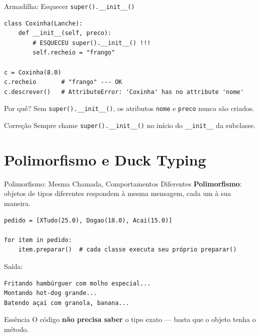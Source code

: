 \documentclass[aspectratio=169]{beamer}
\begin{document}
\begin{frame}[fragile]{Armadilha: Esquecer \texttt{super().\_\_init\_\_()}}
  \begin{lstlisting}
class Coxinha(Lanche):
    def __init__(self, preco):
        # ESQUECEU super().__init__() !!!
        self.recheio = "frango"

c = Coxinha(8.0)
c.recheio       # "frango" --- OK
c.descrever()   # AttributeError: 'Coxinha' has no attribute 'nome'
  \end{lstlisting}

  \begin{alertblock}{Por quê?}
    Sem \texttt{super().\_\_init\_\_()}, os atributos \texttt{nome} e \texttt{preco} nunca são criados.
  \end{alertblock}

  \begin{exampleblock}{Correção}
    Sempre chame \texttt{super().\_\_init\_\_()} no início do \texttt{\_\_init\_\_} da subclasse.
  \end{exampleblock}
\end{frame}

\section{Polimorfismo e Duck Typing}

\begin{frame}[fragile]{Polimorfismo: Mesma Chamada, Comportamentos Diferentes}
  \textbf{Polimorfismo}: objetos de tipos diferentes respondem à mesma mensagem, cada um à sua maneira.

  \begin{lstlisting}
pedido = [XTudo(25.0), Dogao(18.0), Acai(15.0)]

for item in pedido:
    item.preparar()  # cada classe executa seu próprio preparar()
  \end{lstlisting}

  Saída:
  \begin{lstlisting}[numbers=none]
Fritando hambúrguer com molho especial...
Montando hot-dog grande...
Batendo açaí com granola, banana...
  \end{lstlisting}

  \begin{exampleblock}{Essência}
    O código \textbf{não precisa saber} o tipo exato --- basta que o objeto tenha o método.
  \end{exampleblock}
\end{frame}
\end{document}
